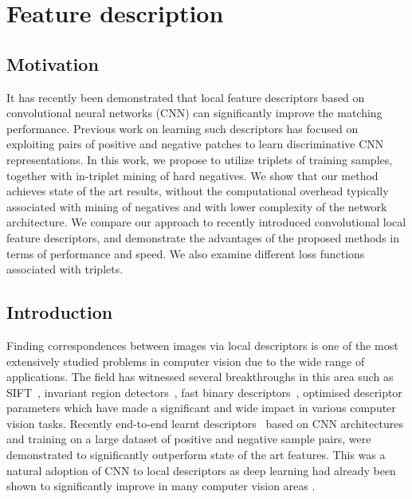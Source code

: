 \newpage

\section{Feature description}

\subsection{Motivation}
It has recently been demonstrated that local feature descriptors
based on convolutional neural networks (CNN) can significantly
improve the matching performance.  Previous work on learning such
descriptors has focused on exploiting pairs of positive and negative
patches to learn discriminative CNN representations. In this work,
we propose to utilize triplets of training samples, together with
in-triplet mining of hard negatives. We show that our method
achieves state of the art results, without the computational
overhead typically associated with mining of negatives and with
lower complexity of the network architecture.  We compare our
approach to recently introduced convolutional local feature
descriptors, and demonstrate the advantages of the proposed methods
in terms of performance and speed.  We also examine different loss
functions associated with triplets.

\subsection{Introduction}

Finding correspondences between images via local descriptors is one of
the most extensively studied problems in computer vision due to the
wide range of applications. The field has witnessed several
breakthroughs in this area such as
SIFT~\cite{Lowe:2004:DIF:993451.996342}, invariant region
detectors~\cite{mikolajczykIJCV2004}, fast binary
descriptors~\cite{Calonder:2010:BBR:1888089.1888148}, optimised
descriptor parameters \cite{WHB09,simonyan2014learning} which have
made a significant and wide impact in various computer vision tasks.
Recently end-to-end learnt
descriptors~\cite{FDB14,simo2015deepdesc,ZagoruykoCVPR2015,Han_2015_CVPR}
based on CNN architectures and training on a large dataset of positive
and negative sample pairs, were demonstrated to significantly
outperform state of the art features. This was a natural adoption of
CNN to local descriptors as deep learning had already been shown to
significantly improve in many computer vision areas
\cite{lecun2015deep}.


